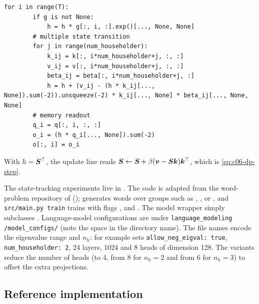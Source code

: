 \begin{lstlisting}[caption={Excerpt from \texttt{repos/\allowbreak{}fla-org\_\_flash-linear-attention/\allowbreak{}fla/\allowbreak{}ops/\allowbreak{}gated\_delta\_product/\allowbreak{}naive.py}},label={lst:c06-dp-naive}]
    for i in range(T):
        if g is not None:
            h = h * g[:, i, :].exp()[..., None, None]
        # multiple state transition
        for j in range(num_householder):
            k_ij = k[:, i*num_householder+j, :, :]
            v_ij = v[:, i*num_householder+j, :, :]
            beta_ij = beta[:, i*num_householder+j, :]
            h = h + (v_ij - (h * k_ij[..., None]).sum(-2)).unsqueeze(-2) * k_ij[..., None] * beta_ij[..., None, None]
        # memory readout
        q_i = q[:, i, :, :]
        o_i = (h * q_i[..., None]).sum(-2)
        o[:, i] = o_i
\end{lstlisting}

With $h=\bm{S}^{\top}$, the update line reads $\bm{S}\gets\bm{S}+\beta(\bm{v}-\bm{S}\bm{k})\bm{k}^{\top}$, which is
\eqref{eq:c06-dp-step}.

\begin{implnote}[title={In the code: experiments and configurations}]
The state-tracking experiments live in .
The code is adapted from the word-problem repository of \citet{c06-merrill2024illusion}
();  generates words over
groups such as , ,  or , and \texttt{src/main.py train}
trains with flags ,  and .
The model wrapper  simply subclasses
. Language-model configurations are under
\texttt{language\_modeling /model\_configs/} (note the space in the directory name). The file
names encode the eigenvalue range and $n_h$: for example
 sets \texttt{allow\_neg\_eigval: true},
\texttt{num\_householder: 2}, 24 layers,  1024 and 8 heads of dimension 128.
The  variants reduce the number of heads (to 4, from 8 for $n_h=2$
and from 6 for $n_h=3$) to offset the extra projections.
\end{implnote}

\subsection{Reference implementation}

